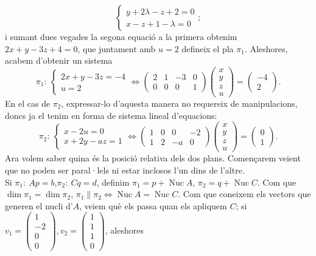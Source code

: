 \documentclass[11pt]{article}
\DeclareMathOperator{\nuc}{Nuc}
\begin{document}
\begin{equation}
\begin{cases}y+2\lambda-z+2=0\\ x-z+1-\lambda=0\end{cases};
\end{equation}
i sumant dues vegades la segona equació a la primera obtenim $2x+y-3z+4=0$, que juntament amb $u=2$ defineix el pla $\pi_1$. Aleshores, acabem d'obtenir un sistema
\begin{equation}
\pi_1:\ \begin{cases} 2x+y-3z=-4\\ u=2\end{cases}\iff\begin{pmatrix}
2 & 1 & -3 & 0\\
0 & 0 & 0 & 1
\end{pmatrix}\begin{pmatrix}x\\ y\\ z\\ u\end{pmatrix}=\begin{pmatrix}-4\\ 2\end{pmatrix}.
\end{equation}
En el cas de $\pi_2$, expressar-lo d'aquesta manera no requereix de manipulacions, doncs ja el tenim en forma de sistema lineal d'equacions:
\begin{equation}
\pi_2:\ \begin{cases} x-2u=0\\ x+2y-az=1\end{cases}\iff\begin{pmatrix}
1 & 0 & 0 & -2\\
1 & 2 & -a & 0
\end{pmatrix}\begin{pmatrix}x\\ y\\ z\\ u\end{pmatrix}=\begin{pmatrix}0\\ 1\end{pmatrix}.
\end{equation}
Ara volem saber quina és la posició relativa dels dos plans. Començarem veient que no poden ser paral·lels ni estar inclosos l'un dins de l'altre.\\
Si $\pi_1:\ Ap=b$,$\pi_2:\ Cq=d$, definim $\pi_1=p+\nuc A$, $\pi_2=q+\nuc C$. Com que $\dim\pi_1=\dim\pi_2$, $\pi_1\parallel\pi_2\iff \nuc A=\nuc C$. Com que coneixem els vectors que generen el nucli d'$A$, veiem què els passa quan els apliquem $C$; si $v_1=\begin{pmatrix}
1\\ -2\\ 0\\ 0
\end{pmatrix},v_2=\begin{pmatrix}
1\\ 1\\ 1\\ 0
\end{pmatrix}$, aleshores
\end{document}
